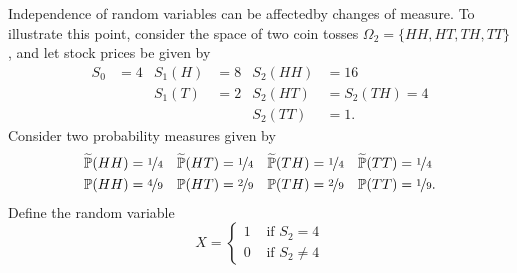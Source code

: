 \documentclass[11pt]{article}
\renewcommand\P{\mathbb{P}} %
\newcounter{question}[section]
\begin{document}
    \begin{hwquestion}
        Independence of random variables can be affectedby changes of measure. To illustrate
        this point, consider the space of two coin tosses $\Omega_2 = \{ HH, HT, TH, TT \}$,
        and let stock prices be given by
        \[
            \begin{aligned}
                S_0 &= 4
                &
                S_1(H) &= 8
                &
                S_2(HH) &= 16 \\
                {} & {}
                &
                S_1(T) &= 2
                &
                S_2(HT) &= S_2(TH) = 4 \\
                {} & {}
                &
                {} & {}
                &
                S_2(TT) &= 1.
            \end{aligned}
        \]
        Consider two probability measures given by
        \[
            \begin{aligned}
                \widetilde{\P}(HH) &= \nicefrac{1}{4}
                &
                \widetilde{\P}(HT) &= \nicefrac{1}{4}
                &
                \widetilde{\P}(TH) &= \nicefrac{1}{4}
                &
                \widetilde{\P}(TT) &= \nicefrac{1}{4} \\
                \P(HH) &= \nicefrac{4}{9}
                &
                \P(HT) &= \nicefrac{2}{9}
                &
                \P(TH) &= \nicefrac{2}{9}
                &
                \P(TT) &= \nicefrac{1}{9}.
            \end{aligned}
        \]
        Define the random variable
        \[
            X = \begin{cases}
                1 &\text{ if } S_2 = 4 \\
                0 &\text{ if } S_2 \neq 4
            \end{cases}
        \]


\end{hwquestion}
\end{document}
